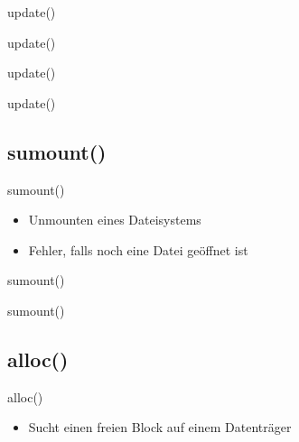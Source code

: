 \documentclass{beamer}
\begin{document}
\begin{frame}{update()}
\end{frame}

\begin{frame}{update()}
\end{frame}

\begin{frame}{update()}
\end{frame}

\begin{frame}{update()}
\end{frame}




\subsection{sumount()}

\begin{frame}{sumount()}
    \begin{itemize}
        \item Unmounten eines Dateisystems
        \medskip
        \item Fehler, falls noch eine Datei geöffnet ist
    \end{itemize}
\end{frame}

\begin{frame}{sumount()}
\end{frame}

\begin{frame}{sumount()}
\end{frame}




\subsection{alloc()}

\begin{frame}{alloc()}
    \begin{itemize}
        \item Sucht einen freien Block auf einem Datenträger
    \end{itemize}
\end{frame}
\end{document}
